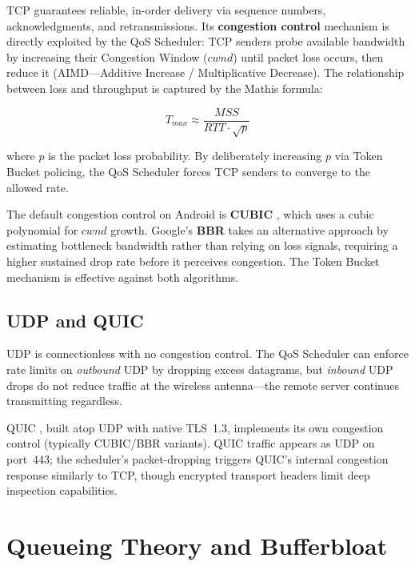 TCP \cite{rfc9293} guarantees reliable, in-order delivery via sequence numbers, acknowledgments, and retransmissions. Its \textbf{congestion control} mechanism \cite{rfc5681} is directly exploited by the QoS Scheduler: TCP senders probe available bandwidth by increasing their Congestion Window ($cwnd$) until packet loss occurs, then reduce it (AIMD---Additive Increase / Multiplicative Decrease). The relationship between loss and throughput is captured by the Mathis formula:

\begin{equation}
T_{max} \approx \frac{MSS}{RTT \cdot \sqrt{p}}
\label{eq:tcp_throughput}
\end{equation}

\noindent where $p$ is the packet loss probability. By deliberately increasing $p$ via Token Bucket policing, the QoS Scheduler forces TCP senders to converge to the allowed rate.

The default congestion control on Android is \textbf{CUBIC} \cite{ha_2008}, which uses a cubic polynomial for $cwnd$ growth. Google's \textbf{BBR} \cite{cardwell_2017} takes an alternative approach by estimating bottleneck bandwidth rather than relying on loss signals, requiring a higher sustained drop rate before it perceives congestion. The Token Bucket mechanism is effective against both algorithms.

\subsection{UDP and QUIC}

UDP \cite{rfc768} is connectionless with no congestion control. The QoS Scheduler can enforce rate limits on \textit{outbound} UDP by dropping excess datagrams, but \textit{inbound} UDP drops do not reduce traffic at the wireless antenna---the remote server continues transmitting regardless.

QUIC \cite{rfc9000}, built atop UDP with native TLS~1.3, implements its own congestion control (typically CUBIC/BBR variants). QUIC traffic appears as UDP on port~443; the scheduler's packet-dropping triggers QUIC's internal congestion response similarly to TCP, though encrypted transport headers limit deep inspection capabilities.

\section{Queueing Theory and Bufferbloat}
\label{sec:queueing_theory}

